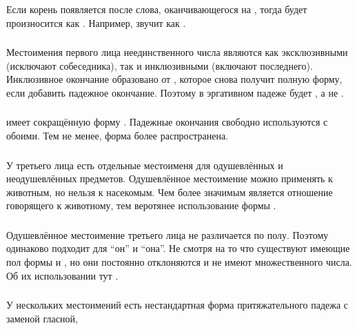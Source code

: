 Если корень  появляется после слова, оканчивающегося на , тогда  будет произносится как . Например,  звучит как .

\subsubsection{} Местоимения первого лица неединственного числа являются как эксклюзивными (исключают собеседника), так и инклюзивными (включают последнего). Инклюзивное окончание  образовано от , которое снова получит полную форму, если добавить падежное окончание.
Поэтому  в эргативном падеже будет , а не .

\subsubsection{}  имеет сокращённую форму .
Падежные окончания свободно используются с обоими. Тем не менее, форма  более распространена.

\subsubsection{} У третьего лица есть отдельные местоименя для одушевлённых и неодушевлённых предметов. Одушевлённое местоимение  можно применять к животным, но нельзя к насекомым. Чем более значимым является отношение говорящего к животному, тем веротянее использование формы .

\subsubsection{} Одушевлённое местоимение третьего лица  не различается по полу. Поэтому одинаково подходит для ``он'' и ``она''.  Не смотря на то что существуют имеющие пол формы   и 
, но они постоянно отклоняются и не имеют множественного числа.  Об их использовании тут  .
\label{morph:pron:gender}

\subsubsection{} \label{morph:pron:irreg-gen}
У нескольких местоимений есть нестандартная форма притяжательного падежа с заменой гласной,


